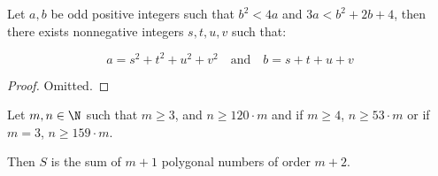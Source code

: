 \begin{lemma}
    \label{lem:CauchyLemma}
    \leanok

    Let $a,b$ be odd positive integers such that $b^2<4a$ and $3a<b^2+2b+4$, then there exists nonnegative integers $s,t,u,v$ such that:

    \[
        a=s^2+t^2+u^2+v^2 \quad \text{and} \quad b=s+t+u+v
    \]
\end{lemma}

\begin{proof}
    Omitted.
\end{proof}


%
%
\begin{theorem}
    \label{thm:CauchyPolygonalNumberTheorem}
    \leanok

    Let $m,n\in\N$ such that $m \geq 3$, and $n \geq 120\cdot m$ and if $m\geq 4$, $n \geq 53\cdot m$ or if $m = 3$, $n \geq 159\cdot m$. 
    
    Then $S$ is the sum of $m+1$ polygonal numbers of order $m + 2$.
\end{theorem}

